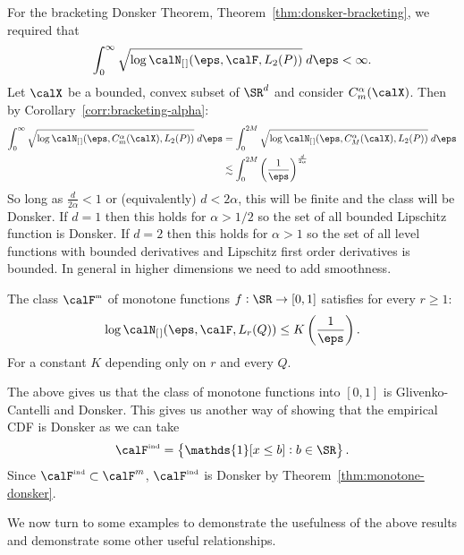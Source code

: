 \begin{example*}[Donsker]
	For the bracketing Donsker Theorem, Theorem~\ref{thm:donsker-bracketing}, we required that
	\[
		\int_{0}^{\infty} \sqrt{\log\calN_{[\hspace{0.1em}]}(\eps,\calF,L_2(P))}\;d\eps < \infty 
	.\] 
	Let \(\calX\) be a bounded, convex subset of \(\SR^d\) and consider \(C_m^\alpha(\calX)\). Then by Corollary~\ref{corr:bracketing-alpha}:
	\begin{align*}
		\int_{0}^{\infty} \sqrt{\log\calN_{[\hspace{0.1em}]}(\eps,C_m^\alpha(\calX), L_2(P))}\;d\eps 
		&= \int_{0}^{2M} \sqrt{\log\calN_{[\hspace{0.1em}]}(\eps,C_M^\alpha(\calX),L_2(P))}\;d\eps \\
		&\lesssim \int_{0}^{2M} \left(\frac{1}{\eps}\right)^{\frac{d}{2\alpha}} 
	\end{align*}
	So long as \(\frac{d}{2\alpha} < 1\) or (equivalently) \(d < 2\alpha\), this will be finite and the class will be Donsker. If \(d=1\) then this holds for \(\alpha > 1/2\) so the set of all bounded Lipschitz function is Donsker. If \(d=2\) then this holds for \(\alpha > 1\) so the set of all level functions with bounded derivatives and Lipschitz first order derivatives is bounded. In general in higher dimensions we need to add smoothness.
\end{example*}
\begin{theorem}
	\label{thm:monotone-donsker}
	The class \(\calF^{\text{\tiny m}}\) of monotone functions \(f:\SR\to[0,1]\) satisfies for every \(r\geq 1\):
	\[
		\log\calN_{[\hspace{0.1em}]}(\eps,\calF,L_r(Q)) \leq K\left(\frac{1}{\eps}\right)
	.\] 
	For a constant \(K\) depending only on \(r\) and every \(Q\).
\end{theorem}
\begin{remark*}
	The above gives us that the class of monotone functions into \([0,1]\) is Glivenko-Cantelli and Donsker. This gives us another way of showing that the empirical CDF is Donsker as we can take 
	\[
	    \calF^{\text{\tiny ind}} = \left\{ \mathds{1}[x \leq b]: b\in\SR \right\}
	.\]
	Since \(\calF^{\text{\tiny ind}} \subset \calF^m\), \(\calF^{\text{\tiny ind}}\) is Donsker by Theorem~\ref{thm:monotone-donsker}.
\end{remark*}
We now turn to some examples to demonstrate the usefulness of the above results and demonstrate some other useful relationships.
